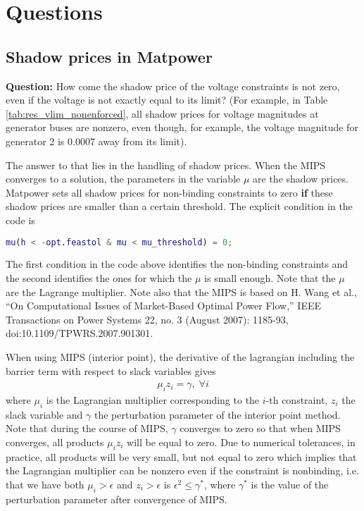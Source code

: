 \documentclass[11pt]{article}
\begin{document}
\section{Questions}
\label{sec:questions}

\subsection{Shadow prices in Matpower}
\label{sec:shad-pric-matp}

\textbf{Question:} How come the shadow price of the voltage constraints is not zero, even if the voltage is not exactly equal to its limit? (For example, in Table \ref{tab:res_vlim_nonenforced}, all shadow prices for voltage magnitudes at generator buses are nonzero, even though, for example, the voltage magnitude for generator 2 is 0.0007 away from its limit). 

The answer to that lies in the handling of shadow prices. When the MIPS converges to a solution, the parameters in the variable $\mu$ are the shadow prices. Matpower sets all shadow prices for non-binding constraints to zero \textbf{if} these shadow prices are smaller than a certain threshold. The explicit condition in the code is 

\begin{lstlisting}[language=Matlab]
  mu(h < -opt.feastol & mu < mu_threshold) = 0;
\end{lstlisting}

The first condition in the code above identifies the non-binding constraints and the second identifies the ones for which the $\mu$ is small enough.
Note that the $\mu$ are the Lagrange multiplier. 
Note also that the MIPS is based on H. Wang et al., ``On Computational Issues of Market-Based Optimal Power Flow,'' IEEE Transactions on Power Systems 22, no. 3 (August 2007): 1185-93, doi:10.1109/TPWRS.2007.901301.

When using MIPS (interior point), the derivative of the lagrangian including the barrier term with respect to slack variables gives
\begin{align}\label{eq:muz}
  \mu_i z_i = \gamma, \; \forall i
\end{align}
where $\mu_i$ is the Lagrangian multiplier corresponding to the $i$-th constraint, $z_i$ the slack variable and $\gamma$ the perturbation parameter of the interior point method. 
Note that during the course of MIPS, $\gamma$ converges to zero so that when MIPS converges, all products $\mu_i z_i$ will be equal to zero. 
Due to numerical tolerances, in practice, all products will be very small, but not equal to zero which implies that the Lagrangian multiplier can be nonzero even if the constraint is nonbinding, i.e. that we have both $\mu_i > \epsilon$ and $z_i > \epsilon$ is $\epsilon^2 \leq \gamma^{*}$, where $\gamma^{*}$ is the value of the perturbation parameter after convergence of MIPS.
\end{document}
